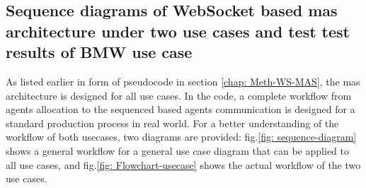 \subsection{Sequence diagrams of WebSocket based \gls{mas} architecture under two use cases and test 
test results of BMW use case}\label{chap: Result-Internal-Usecase}
As listed earlier in form of pseudocode in section \ref{chap: Meth-WS-MAS}, 
the \gls{mas} architecture is designed for all use cases. In the code, a complete 
workflow from agents allocation to the sequenced based agents communication 
is designed for a standard production process in real world. For a better 
understanding of the workflow of both usecases, two diagrams are provided: 
fig.\ref{fig: sequence-diagram} shows a general workflow for a general 
use case diagram that can be applied to all use cases, 
and fig.\ref{fig: Flowchart-usecase} shows the actual workflow of the 
two use cases. 





